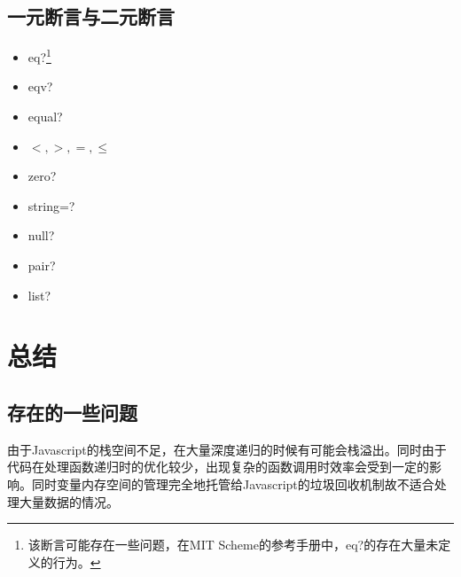 \documentclass[11pt, a4paper]{article}
\begin{document}
		\subsection{一元断言与二元断言}
			\begin{itemize}
				\item eq?\footnote{该断言可能存在一些问题，在MIT Scheme的参考手册中，eq?的存在大量未定义的行为。}
				\item eqv?
				\item equal?
				\item $<,>,=,\leq$
				\item zero?
				\item string=?
				\item null?
				\item pair?
				\item list?
			\end{itemize}
	\section{总结}
		
		\subsection{存在的一些问题}
		由于Javascript的栈空间不足，在大量深度递归的时候有可能会栈溢出。同时由于代码在处理函数递归时的优化较少，出现复杂的函数调用时效率会受到一定的影响。同时变量内存空间的管理完全地托管给Javascript的垃圾回收机制故不适合处理大量数据的情况。
\end{document}
